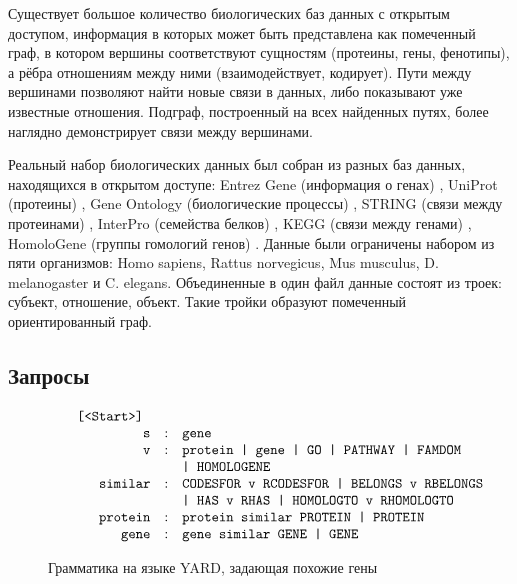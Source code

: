 \documentclass[14pt]{matmex-diploma}
\begin{document}
Существует большое количество биологических баз данных с открытым доступом, информация в которых может быть представлена как помеченный граф, в котором вершины соответствуют сущностям (протеины, гены, фенотипы), а рёбра отношениям между ними (взаимодействует, кодирует). Пути между вершинами позволяют найти новые связи в данных, либо показывают уже известные отношения. Подграф, построенный на всех найденных путях, более наглядно демонстрирует связи между вершинами.

Реальный набор биологических данных был собран из разных баз данных, находящихся в открытом доступе:  Entrez Gene (информация о генах) \cite{entrezgene}, UniProt (протеины) \cite{uniprot}, Gene Ontology (биологические процессы) \cite{geneontology}, STRING (связи между протеинами) \cite{string}, InterPro (семейства белков) \cite{interpro}, KEGG (связи между генами) \cite{kegg}, HomoloGene (группы гомологий генов) \cite{homologene}. Данные были ограничены набором из пяти организмов: Homo sapiens, Rattus norvegicus, Mus musculus, D. melanogaster и C. elegans. Объединенные в один файл данные состоят из троек: субъект, отношение, объект. Такие тройки образуют помеченный ориентированный граф.
\subsection{Запросы}

\begin{figure}
$$
\begin{array}{crcl}
&\mbox{\texttt{ [<Start>] }} \\
&\mbox{\texttt{s}} &:& \mbox{\texttt{gene }} \\
&\mbox{\texttt{v}} &:& \mbox{\texttt{protein | gene | GO | PATHWAY | FAMDOM}} \\
&&&\mbox{\texttt{| HOMOLOGENE}} \\
&\mbox{\texttt{similar}} &:& \mbox{\texttt{CODESFOR v RCODESFOR | BELONGS v RBELONGS}} \\
&&&\mbox{\texttt{| HAS v RHAS | HOMOLOGTO v RHOMOLOGTO}} \\
&\mbox{\texttt{protein}} & :& \mbox{\texttt{protein similar PROTEIN | PROTEIN}} \\
&\mbox{\texttt{gene}} & :& \mbox{\texttt{gene similar GENE | GENE}} \\
\end{array}
$$
\caption{Грамматика на языке YARD, задающая похожие гены}
\label{grammar}
\end{figure}
\end{document}
